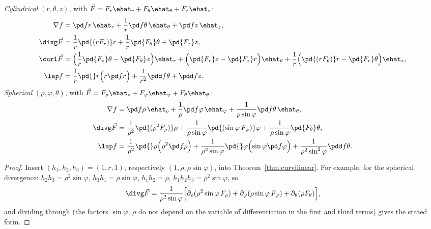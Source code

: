 \begin{corollary}\label{cor:cylsph}
\emph{Cylindrical} $(r,\theta,z)$, with $\vec F=F_r\ehat_r+F_\theta\ehat_\theta+F_z\ehat_z$:
\begin{align*}
\nabla f&=\pd fr\,\ehat_r+\frac1r\pd f\theta\,\ehat_\theta+\pd fz\,\ehat_z,\\
\divg\vec F&=\frac1r\pd{(rF_r)}r+\frac1r\pd{F_\theta}\theta+\pd{F_z}z,\\
\curl\vec F&=\Bigl(\frac1r\pd{F_z}\theta-\pd{F_\theta}z\Bigr)\ehat_r+\Bigl(\pd{F_r}z-\pd{F_z}r\Bigr)\ehat_\theta+\frac1r\Bigl(\pd{(rF_\theta)}r-\pd{F_r}\theta\Bigr)\ehat_z,\\
\lap f&=\frac1r\pd{}r\Bigl(r\pd fr\Bigr)+\frac1{r^2}\pdd f\theta+\pdd fz.
\end{align*}
\emph{Spherical} $(\rho,\varphi,\theta)$, with $\vec F=F_\rho\ehat_\rho+F_\varphi\ehat_\varphi+F_\theta\ehat_\theta$:
\begin{align*}
\nabla f&=\pd f\rho\,\ehat_\rho+\frac1\rho\pd f\varphi\,\ehat_\varphi+\frac1{\rho\sin\varphi}\pd f\theta\,\ehat_\theta,\\
\divg\vec F&=\frac1{\rho^2}\pd{(\rho^2F_\rho)}\rho+\frac1{\rho\sin\varphi}\pd{(\sin\varphi\,F_\varphi)}\varphi+\frac1{\rho\sin\varphi}\pd{F_\theta}\theta,\\
\lap f&=\frac1{\rho^2}\pd{}\rho\Bigl(\rho^2\pd f\rho\Bigr)+\frac1{\rho^2\sin\varphi}\pd{}\varphi\Bigl(\sin\varphi\pd f\varphi\Bigr)+\frac1{\rho^2\sin^2\varphi}\pdd f\theta .
\end{align*}
\end{corollary}

\begin{proof}
Insert $(h_1,h_2,h_3)=(1,r,1)$, respectively $(1,\rho,\rho\sin\varphi)$, into Theorem~\ref{thm:curvilinear}. For example, for the spherical divergence: $h_2h_3=\rho^2\sin\varphi$, $h_3h_1=\rho\sin\varphi$, $h_1h_2=\rho$, $h_1h_2h_3=\rho^2\sin\varphi$, so
\[
\divg\vec F=\frac1{\rho^2\sin\varphi}\Bigl[\partial_\rho(\rho^2\sin\varphi\,F_\rho)+\partial_\varphi(\rho\sin\varphi\,F_\varphi)+\partial_\theta(\rho F_\theta)\Bigr],
\]
and dividing through (the factors $\sin\varphi$, $\rho$ do not depend on the variable of differentiation in the first and third terms) gives the stated form.
\end{proof}

